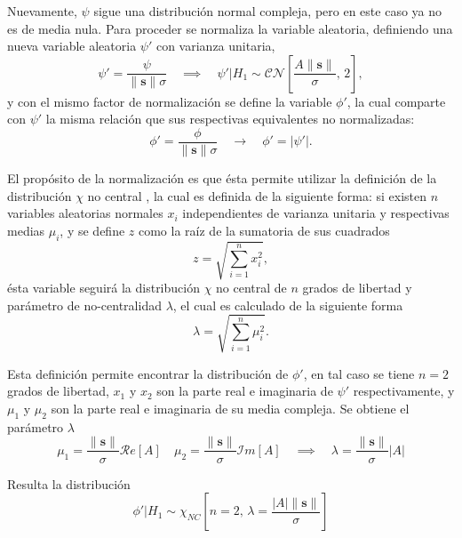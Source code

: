 Nuevamente, $\psi$ sigue una distribución normal compleja, pero en este caso ya no es de media nula. Para proceder se normaliza la variable aleatoria, definiendo una nueva variable aleatoria $\psi'$ con varianza unitaria,
\begin{equation}
    \psi' = \frac{\psi}{\lVert \mathbf{s} \rVert \sigma} \quad \implies \quad     \psi' | H_1 \sim \mathcal{CN}\left[\frac{A\lVert\mathbf{s}\rVert}{\sigma},\, 2 \right],
\end{equation}
y con el mismo factor de normalización se define la variable $\phi'$, la cual comparte con $\psi'$ la misma relación que sus respectivas equivalentes no normalizadas:
\begin{equation}
\phi' = \frac{\phi}{\lVert \mathbf{s} \rVert \sigma} \quad \longrightarrow \quad     \phi' = \lvert\psi'\rvert.
\end{equation}

El propósito de la normalización es que ésta permite utilizar la definición de la distribución $\chi$ no central \cite{distributions}, la cual es definida de la siguiente forma: si existen $n$ variables aleatorias normales $x_i$ independientes de varianza unitaria y respectivas medias $\mu_i$, y se define $z$ como la raíz de la sumatoria de sus cuadrados
\begin{equation}
    z = \sqrt{\sum_{i=1}^{n}x_i^2},
\end{equation}
ésta variable seguirá la distribución $\chi$ no central de $n$ grados de libertad y parámetro de no-centralidad $\lambda$, el cual es calculado de la siguiente forma
\begin{equation}
    \lambda = \sqrt{\sum_{i=1}^{n}\mu_i^2}.
\end{equation}

Esta definición permite encontrar la distribución de $\phi'$, en tal caso se tiene $n = 2$ grados de libertad, $x_1$ y $x_2$ son la parte real e imaginaria de $\psi'$ respectivamente, y $\mu_1$ y $\mu_2$ son la parte real e imaginaria de su media compleja. Se obtiene el parámetro $\lambda$
\begin{equation}
    \displaystyle\mu_1 = \frac{\rVert\mathbf{s}\rVert}{\sigma}\mathcal{R}e\left[A\right] \quad \displaystyle\mu_2 = \frac{\rVert\mathbf{s}\rVert}{\sigma}\mathcal{I}m\left[A\right] \quad \implies \quad \lambda = \frac{\lVert\mathbf{s}\rVert}{\sigma}\lvert A \rvert
\end{equation}

Resulta la distribución
\begin{equation}
    \phi' | H_1 \sim \chi_{NC}\left[n = 2, \, \lambda = \frac{|A|\lVert\mathbf{s}\rVert}{\sigma}\right] 
\end{equation}

